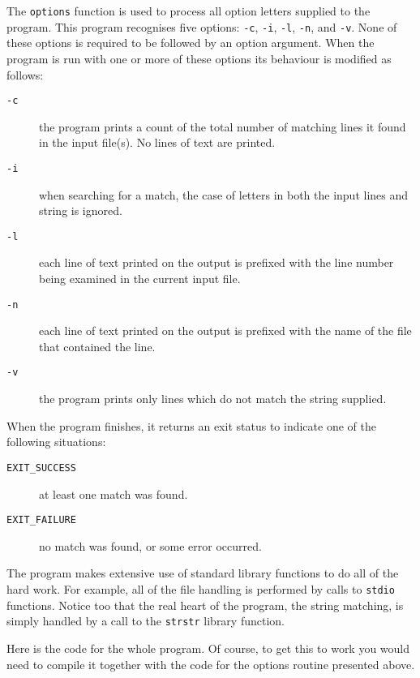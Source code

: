   The \texttt{options} function is used to process all option letters
   supplied to the program. This program recognises five options:
   \texttt{-c}, \texttt{-i}, \texttt{-l}, \texttt{-n}, and
   \texttt{-v}. None of these options is required to be followed by an
   option argument. When the program is run with one or more of these options
   its behaviour is modified as follows:


  \begin{description}
   \item[\texttt{-c}] the program prints a count of the total number of matching lines it
    found in the input file(s). No lines of text are printed.

   \item[\texttt{-i}] when searching for a match, the case of letters in both the input lines
    and string is ignored.

   \item[\texttt{-l}] each line of text printed on the output is prefixed with the line number
    being examined in the current input file.

   \item[\texttt{-n}] each line of text printed on the output is prefixed with the name of the
    file that contained the line.

   \item[\texttt{-v}] the program prints only lines which do not match the string
    supplied.
  \end{description}

  When the program finishes, it returns an exit status to indicate one of
   the following situations:


  \begin{description}
   \item[\texttt{EXIT\_SUCCESS}] at least one match was found.
   \item[\texttt{EXIT\_FAILURE}] no match was found, or some error occurred.
  \end{description}

  The program makes extensive use of standard library functions to do all of
   the hard work. For example, all of the file handling is performed by calls
   to \texttt{stdio} functions. Notice too that the real heart of the
   program, the string matching, is simply handled by a call to the
   \texttt{strstr} library function.


  Here is the code for the whole program. Of course, to get this to work you
   would need to compile it together with the code for the options routine
   presented above.


